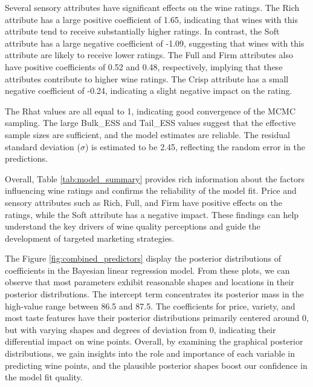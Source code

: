 \documentclass{article}
\begin{document}
Several sensory attributes have significant effects on the wine ratings. The Rich attribute has a large positive coefficient of 1.65, indicating that wines with this attribute tend to receive substantially higher ratings. In contrast, the Soft attribute has a large negative coefficient of -1.09, suggesting that wines with this attribute are likely to receive lower ratings. The Full and Firm attributes also have positive coefficients of 0.52 and 0.48, respectively, implying that these attributes contribute to higher wine ratings. The Crisp attribute has a small negative coefficient of -0.24, indicating a slight negative impact on the rating.

The Rhat values are all equal to 1, indicating good convergence of the MCMC sampling. The large Bulk\_ESS and Tail\_ESS values suggest that the effective sample sizes are sufficient, and the model estimates are reliable. The residual standard deviation ($\sigma$) is estimated to be 2.45, reflecting the random error in the predictions.

Overall, Table \ref{tab:model_summary} provides rich information about the factors influencing wine ratings and confirms the reliability of the model fit. Price and sensory attributes such as Rich, Full, and Firm have positive effects on the ratings, while the Soft attribute has a negative impact. These findings can help understand the key drivers of wine quality perceptions and guide the development of targeted marketing strategies.


The Figure \ref{fig:combined_predictors} display the posterior distributions of coefficients in the Bayesian linear regression model. From these plots, we can observe that most parameters exhibit reasonable shapes and locations in their posterior distributions. The intercept term concentrates its posterior mass in the high-value range between 86.5 and 87.5. The coefficients for price, variety, and most taste features have their posterior distributions primarily centered around 0, but with varying shapes and degrees of deviation from 0, indicating their differential impact on wine points. Overall, by examining the graphical posterior distributions, we gain insights into the role and importance of each variable in predicting wine points, and the plausible posterior shapes boost our confidence in the model fit quality.
\end{document}
